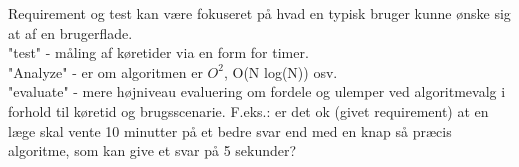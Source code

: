 Requirement og test kan være fokuseret på hvad en typisk bruger kunne ønske sig at af en brugerflade.\\
"test" - måling af køretider via en form for timer.\\
"Analyze" - er om algoritmen er $O^2$, O(N log(N)) osv.\\
"evaluate" - mere højniveau evaluering om fordele og ulemper ved algoritmevalg i forhold til køretid og brugsscenarie. F.eks.: er det ok (givet requirement) at en læge skal vente 10 minutter på et bedre svar end med en knap så præcis algoritme, som kan give et svar på 5 sekunder?